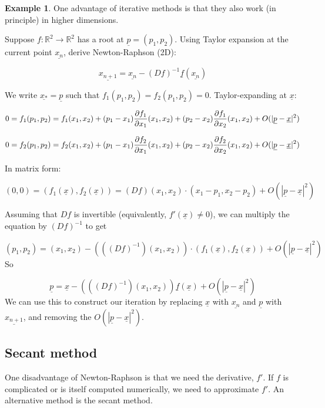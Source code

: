 \documentclass[12pt,a4paper]{article}
\theoremstyle{definition}
\newtheorem{example}[definition]{Example}
\begin{document}
\begin{example}
	One advantage of iterative methods is that they also work (in principle) in higher dimensions.

	Suppose $f: \mathbb{R}^2 \rightarrow \mathbb{R}^2$ has a root at $\underline{p} = (p_1, p_2)$. Using Taylor expansion at the current point $\underline{x_n}$, derive Newton-Raphson (2D):

	\[\underline{x_{n + 1}} = \underline{x_n} - {(Df)}^{-1} \underline{f}(\underline{x_n})\]

	We write $\underline{x_*} = \underline{p}$ such that $f_1(p_1, p_2) = f_2(p_1, p_2) = 0$. Taylor-expanding at $\underline{x}$:

	\[0 = f_1(p_1, p_2) = f_1(x_1, x_2) + (p_1 - x_1) \diffp{f_1}{x_1} (x_1, x_2) + (p_2 - x_2) \diffp{f_1}{x_2} (x_1, x_2) + O(|\underline{p} - \underline{x}|^2)\]

	\[0 = f_2(p_1, p_2) = f_2(x_1, x_2) + (p_1 - x_1) \diffp{f_2}{x_1} (x_1, x_2) + (p_2 - x_2) \diffp{f_2}{x_2} (x_1, x_2) + O(|\underline{p} - \underline{x}|^2)\]

	In matrix form:

	\[(0, 0) = (f_1(\underline{x}), f_2(\underline{x})) = (Df)(x_1, x_2) \cdot (x_1 - p_1, x_2 - p_2) + O(|\underline{p} - \underline{x}|^2)\]

	Assuming that $Df$ is invertible (equivalently, $f'(\underline{x}) \ne 0$), we can multiply the equation by ${(Df)}^{-1}$ to get

	\[ (p_1, p_2) = (x_1, x_2) - (({(Df)}^{-1})(x_1, x_2)) \cdot (f_1(\underline{x}), f_2(\underline{x})) + O(|\underline{p} - \underline{x}|^2)\] So
	
	\[\underline{p} = \underline{x} - (({(Df)}^{-1})(x_1, x_2)) \underline{f}(\underline{x}) + O(|\underline{p} - \underline{x}|^2) \] We can use this to construct our iteration by replacing $\underline{x}$ with $\underline{x_n}$ and $\underline{p}$ with $\underline{x_{n + 1}}$, and removing the $O(|\underline{p} - \underline{x}|^2)$.
\end{example}

\subsection{Secant method}

One disadvantage of Newton-Raphson is that we need the derivative, $f'$. If $f$ is complicated or is itself computed numerically, we need to approximate $f'$. An alternative method is the secant method.
\end{document}
